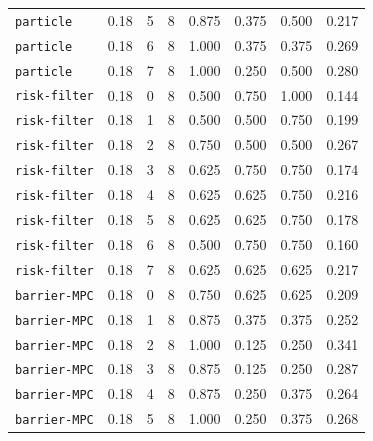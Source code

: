 \documentclass{article}
\begin{document}
\begin{center}
{\begin{tabular}{llllcccc}
\texttt{particle} & 0.18 & 5 & 8 & 0.875 & 0.375 & 0.500 & 0.217 \\
\texttt{particle} & 0.18 & 6 & 8 & 1.000 & 0.375 & 0.375 & 0.269 \\
\texttt{particle} & 0.18 & 7 & 8 & 1.000 & 0.250 & 0.500 & 0.280 \\
\texttt{risk-filter} & 0.18 & 0 & 8 & 0.500 & 0.750 & 1.000 & 0.144 \\
\texttt{risk-filter} & 0.18 & 1 & 8 & 0.500 & 0.500 & 0.750 & 0.199 \\
\texttt{risk-filter} & 0.18 & 2 & 8 & 0.750 & 0.500 & 0.500 & 0.267 \\
\texttt{risk-filter} & 0.18 & 3 & 8 & 0.625 & 0.750 & 0.750 & 0.174 \\
\texttt{risk-filter} & 0.18 & 4 & 8 & 0.625 & 0.625 & 0.750 & 0.216 \\
\texttt{risk-filter} & 0.18 & 5 & 8 & 0.625 & 0.625 & 0.750 & 0.178 \\
\texttt{risk-filter} & 0.18 & 6 & 8 & 0.500 & 0.750 & 0.750 & 0.160 \\
\texttt{risk-filter} & 0.18 & 7 & 8 & 0.625 & 0.625 & 0.625 & 0.217 \\
\texttt{barrier-MPC} & 0.18 & 0 & 8 & 0.750 & 0.625 & 0.625 & 0.209 \\
\texttt{barrier-MPC} & 0.18 & 1 & 8 & 0.875 & 0.375 & 0.375 & 0.252 \\
\texttt{barrier-MPC} & 0.18 & 2 & 8 & 1.000 & 0.125 & 0.250 & 0.341 \\
\texttt{barrier-MPC} & 0.18 & 3 & 8 & 0.875 & 0.125 & 0.250 & 0.287 \\
\texttt{barrier-MPC} & 0.18 & 4 & 8 & 0.875 & 0.250 & 0.375 & 0.264 \\
\texttt{barrier-MPC} & 0.18 & 5 & 8 & 1.000 & 0.250 & 0.375 & 0.268 \\
\bottomrule
\end{tabular}%
}
\end{center}
\end{document}
